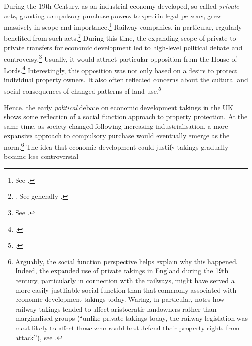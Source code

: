 During the 19th Century, as an industrial economy developed, so-called {\it private} acts, granting compulsory purchase powers to specific legal persons, grew massively in scope and importance.\footnote{See \cite[204]{allen00}.} Railway companies, in particular, regularly benefited from such acts.\footnote{\cite[204]{allen00}. See generally \cite{kostal97}.} During this time, the expanding scope of private-to-private transfers for economic development led to high-level political debate and controversy.\footnote{See \cite[204]{allen00}.} Usually, it would attract particular opposition from the House of Lords.\footcite[204]{allen00} Interestingly, this opposition was not only based on a desire to protect individual property owners. It also often reflected concerns about the cultural and social consequences of changed patterns of land use.\footcite[204]{allen00}

Hence, the early {\it political} debate on economic development takings in the UK shows some reflection of a social function approach to property protection. At the same time, as society changed following increasing industrialisation, a more expansive approach to compulsory purchase would eventually emerge as the norm.\footnote{Arguably, the social function perspective helps explain why this happened. Indeed, the expanded use of private takings in England during the 19th century, particularly in connection with the railways, might have served a more easily justifiable social function than that commonly associated with economic development takings today. Waring, in particular, notes how railway takings tended to affect aristocratic landowners rather than marginalised groups (``unlike private takings today, the railway legislation was most likely to affect those who could best defend their property rights from attack''), see \cite[111]{waring09}.} The idea that economic development could justify takings gradually became less controversial.


